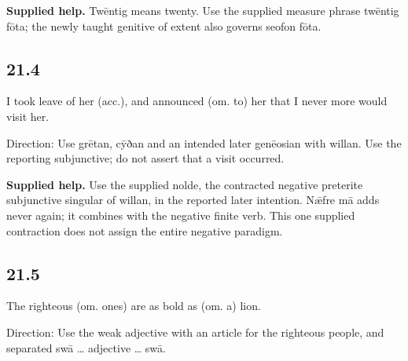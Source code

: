\textbf{Supplied help.} Twēntig means twenty. Use the supplied measure phrase twēntig fōta; the newly taught genitive of extent also governs seofon fōta.

\subsection*{21.4}

\par\begin{minipage}{\linewidth}\raggedright
I took leave of her (acc.), and announced (om. to) her that I never more would visit her.

Direction: Use grētan, cȳðan and an intended later genēosian with willan. Use the reporting subjunctive; do not assert that a visit occurred.

\end{minipage}\par\addvspace{4pt}

\textbf{Supplied help.} Use the supplied nolde, the contracted negative preterite subjunctive singular of willan, in the reported later intention. Nǣfre mā adds never again; it combines with the negative finite verb. This one supplied contraction does not assign the entire negative paradigm.

\subsection*{21.5}

\par\begin{minipage}{\linewidth}\raggedright
The righteous (om. ones) are as bold as (om. a) lion.

Direction: Use the weak adjective with an article for the righteous people, and separated swā … adjective … swā.

\end{minipage}\par\addvspace{4pt}


